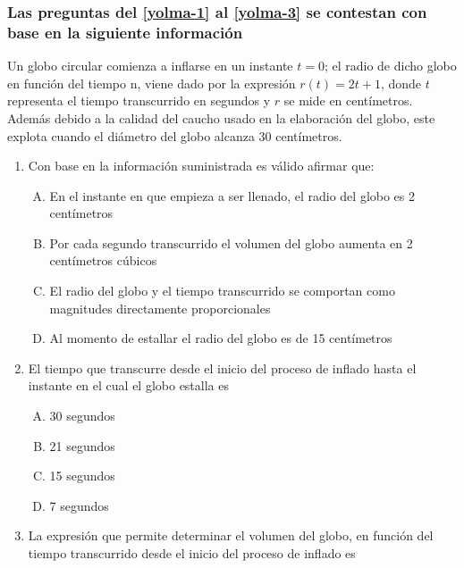 \subsubsection*{Las preguntas del \ref{yolma-1} al \ref{yolma-3} se contestan con base en la siguiente información}


Un globo circular comienza a inflarse en un instante $t=0$; el radio de dicho globo en función del tiempo n, viene dado por la expresión $r (t)=2t+1$, donde $t$ representa el tiempo transcurrido en segundos y $r$ se mide en centímetros. Además debido a la calidad del caucho usado en la elaboración del globo, este explota cuando el diámetro del globo  alcanza 30 centímetros.\\
\begin{enumerate}

\item Con base en la información suministrada es válido afirmar que:\label{yolma-1}\\



\begin{enumerate}[(A)]
\item  En el instante en que empieza a ser llenado, el radio del globo es 2 centímetros
\item Por cada segundo transcurrido el volumen del globo aumenta en 2 centímetros cúbicos
\item El radio del globo y el tiempo transcurrido se comportan como magnitudes directamente proporcionales
\item Al momento de estallar el radio del globo es de 15 centímetros 
\end{enumerate}

\newpage
\item  El tiempo que transcurre desde el inicio del proceso de inflado hasta el instante en el cual el globo estalla es  \label{yolma-2}\\

\begin{enumerate}[(A)]
\item  30 segundos
\item 21 segundos
\item 15 segundos
\item 7 segundos
\end{enumerate}


\item  La expresión que permite determinar el volumen del globo, en función del tiempo transcurrido desde el inicio del proceso de inflado es \label{yolma-3}\\


\end{enumerate}
